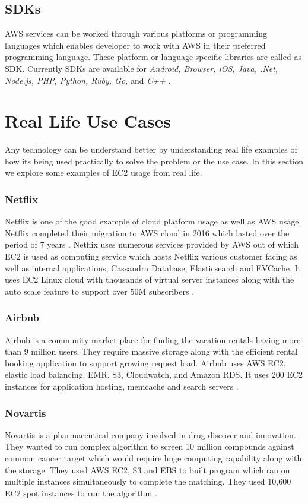 \subsection{SDKs}
AWS services can be worked through various platforms or programming languages which enables developer to work with AWS in their preferred programming language. These platform or language specific libraries are called as SDK. Currently SDKs are available for \emph{Android, Browser, iOS, Java, .Net, Node.js, PHP, Python, Ruby, Go,} and \emph{C++} \cite{www-aws-ec2-sdk}. 

\section{Real Life Use Cases}
Any technology can be understand better by understanding real life examples of how its being used practically to solve the problem or the use case. In this section we explore some examples of EC2 usage from real life.

\subsubsection{Netflix}
Netflix is one of the good example of cloud platform usage as well as AWS usage. Netflix completed their migration to AWS cloud in 2016 which lasted over the period of 7 years \cite{www-media-netflix}. Netflix uses numerous services provided by AWS out of which EC2 is used as computing service which hosts Netflix various customer facing as well as internal applications, Cassandra Database, Elasticsearch and EVCache. It uses EC2 Linux cloud with thousands of virtual server instances along with the auto scale feature to support over 50M subscribers \cite{www-brendangregg}.

\subsubsection{Airbnb}
Airbnb is a community market place for finding the vacation rentals having more than 9 million users. They require massive storage along with the efficient rental booking application to support growing request load. Airbnb uses AWS EC2, elastic load balancing, EMR, S3, Cloudwatch, and Amazon RDS. It uses 200 EC2 instances for application hosting, memcache and search servers \cite{www-aws-ec2-airbnb}.

\subsubsection{Novartis}
Novartis is a pharmaceutical company involved in drug discover and innovation. They wanted to run complex algorithm to screen 10 million compounds against common cancer target which would require huge computing capability along with the storage. They used AWS EC2, S3 and EBS to built program which ran on multiple instances simultaneously to complete the matching. They used 10,600 EC2 spot instances to run the algorithm \cite{www-aws-ec2-novartis}.

